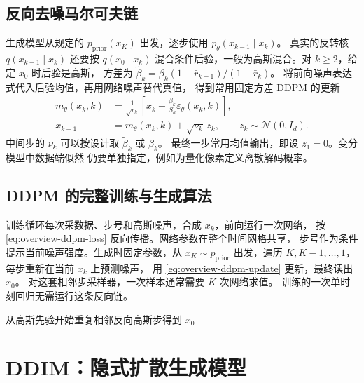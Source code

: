 \subsection{反向去噪马尔可夫链}

生成模型从规定的 \(p_{\mathrm{prior}}(x_K)\) 出发，逐步使用
\(p_\theta(x_{k-1}\mid x_k)\)。
真实的反转核 \(q(x_{k-1}\mid x_k)\) 还要按 \(q(x_0\mid x_k)\)
混合条件后验，一般为高斯混合。对 \(k\ge 2\)，给定 \(x_0\) 时后验是高斯，
方差为 \(\widetilde\beta_k=\beta_k(1-\bar r_{k-1})/(1-\bar r_k)\)。
将前向噪声表达式代入后验均值，再用网络噪声替代真值，
得到常用固定方差 DDPM 的更新
\begin{equation}
  \begin{aligned}
  m_\theta(x_k,k)
    &=\frac{1}{\sqrt{r_k}}\left[x_k-
                     \frac{\beta_k}{S_k}\varepsilon_\theta(x_k,k)\right],\\
  x_{k-1}&=m_\theta(x_k,k)+\sqrt{\nu_k}\,z_k,\qquad
  z_k\sim\mathcal N(0,I_d).
  \end{aligned}
  \label{eq:overview-ddpm-update}
\end{equation}
中间步的 \(\nu_k\) 可以按设计取 \(\widetilde\beta_k\) 或 \(\beta_k\)。
最终一步常用均值输出，即设 \(z_1=0\)。变分模型中数据端似然
仍要单独指定，例如为量化像素定义离散解码概率。

\subsection{DDPM 的完整训练与生成算法}

训练循环每次采数据、步号和高斯噪声，合成 \(x_k\)，前向运行一次网络，
按 \eqref{eq:overview-ddpm-loss} 反向传播。网络参数在整个时间网格共享，
步号作为条件提示当前噪声强度。生成时固定参数，从 \(x_K\sim p_{\mathrm{prior}}\)
出发，遍历 \(K,K-1,\ldots,1\)，每步重新在当前 \(x_k\) 上预测噪声，
用 \eqref{eq:overview-ddpm-update} 更新，最终读出 \(x_0\)。
对这套相邻步采样器，一次样本通常需要 \(K\) 次网络求值。
训练的一次单时刻回归无需运行这条反向链。

  {从高斯先验开始}{重复相邻反向高斯步}{得到 \(x_0\)}

\section{DDIM：隐式扩散生成模型}
\label{sec:overview-ddim}


